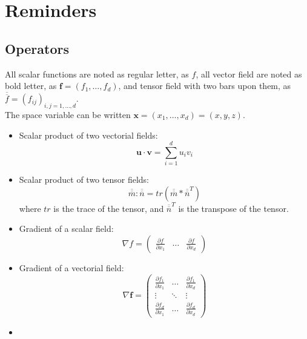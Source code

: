 \chapter{Reminders}

\section{Operators}
All scalar functions are noted as regular letter, as $f$, all vector field are
noted as bold letter, as $\mathbf{f}=(f_1,\dots,f_d)$, and tensor field with two
bars upon them, as $\overline{\overline{f}}=(f_{ij})_{i,j=1,\dots,d}$.\\
The space variable can be written $\mathbf{x}=(x_1,\dots,x_d)=(x,y,z)$.

\begin{itemize}
\item
  Scalar product of two vectorial fields:
  \begin{equation*}
    \mathbf{u}\cdot\mathbf{v} = \sum_{i=1}^d u_i v_i
  \end{equation*}
\item
  Scalar product of two tensor fields:
  \begin{equation*}
    \overline{\overline{m}}:\overline{\overline{n}} =
    tr(\overline{\overline{m}}*\overline{\overline{n}}^T)
  \end{equation*}
  where $tr$ is the trace of the tensor, and $\overline{\overline{n}}^T$ is the
  transpose of the tensor.
\item
  Gradient of a scalar field:
  \begin{equation*}
    \nabla f =
    \begin{pmatrix}
      \frac{\partial f}{\partial x_1}
      & \dots
      & \frac{\partial f}{\partial x_d}
    \end{pmatrix}
  \end{equation*}
\item
  Gradient of a vectorial field:
  \begin{equation*}
    \nabla \mathbf{f} =
    \begin{pmatrix}
      \frac{\partial f_1}{\partial x_1} &
      \dots &
      \frac{\partial f_1}{\partial x_d} \\
      \vdots & \ddots & \vdots \\
      \frac{\partial f_d}{\partial x_1} &
      \dots &
      \frac{\partial f_d}{\partial x_d}
    \end{pmatrix}
  \end{equation*}
\item

\end{itemize}
